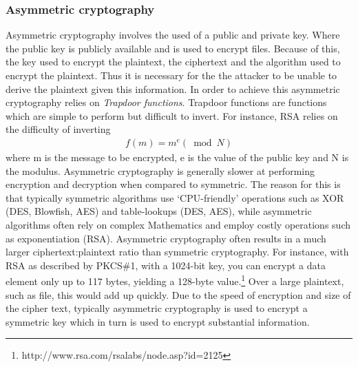 \documentclass[12pt, titlepage]{article}
\begin{document}
\subsubsection*{Asymmetric cryptography}
Asymmetric cryptography involves the used of a public and private key. Where the public key is publicly available and is used to encrypt files. Because of this, the key used to encrypt the plaintext, the ciphertext and the algorithm used to encrypt the plaintext. Thus it is necessary for the the attacker to be unable to derive the plaintext given this information. In order to achieve this asymmetric cryptography relies on \textit{Trapdoor functions}. Trapdoor functions are functions which are simple to perform but difficult to invert. For instance, RSA relies on the difficulty of inverting
\begin{align*}
f(m) = m^e (\bmod N)
\end{align*}
where m is the message to be encrypted, e is the value of the public key and N is the modulus.
\newline \indent Asymmetric cryptography is generally slower at performing encryption and decryption when compared to symmetric. The reason for this is that typically symmetric algorithms use `CPU-friendly' operations such as XOR (DES, Blowfish, AES) and table-lookups (DES, AES), while asymmetric algorithms often rely on complex Mathematics and employ costly operations such as exponentiation (RSA).
\newline \indent Asymmetric cryptography often results in a much larger ciphertext:plaintext ratio than symmetric cryptography. For instance, with RSA as described by PKCS\#1, with a 1024-bit key, you can encrypt a data element only up to 117 bytes, yielding a 128-byte value.\footnote{http://www.rsa.com/rsalabs/node.asp?id=2125} Over a large plaintext, such as file, this would add up quickly.
\newline \indent Due to the speed of encryption and size of the cipher text, typically asymmetric cryptography is used to encrypt a symmetric key which in turn is used to encrypt substantial information.
\end{document}
